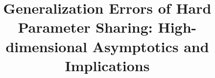 \documentclass{article}
\begin{document}
\title{Generalization Errors of Hard Parameter Sharing: High-dimensional Asymptotics and Implications}
\maketitle






%
%
%



\appendix


%

%
\end{document}
